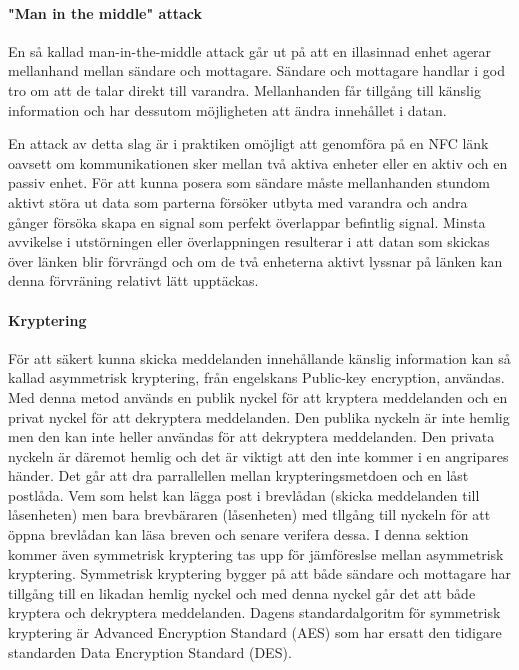 \documentclass[11pt]{article}
\begin{document}
\paragraph{"Man in the middle" attack}
En så kallad man-in-the-middle attack går ut på att en illasinnad enhet agerar mellanhand mellan sändare och mottagare. Sändare och mottagare handlar i god tro om att de talar direkt till varandra. Mellanhanden får tillgång till känslig information och har dessutom möjligheten att ändra innehållet i datan. 

En attack av detta slag är i praktiken omöjligt att genomföra på en NFC länk oavsett om kommunikationen sker mellan två aktiva enheter eller en aktiv och en passiv enhet. För att kunna posera som sändare måste mellanhanden stundom aktivt störa ut data som parterna försöker utbyta med varandra och andra gånger försöka skapa en signal som perfekt överlappar befintlig signal. Minsta avvikelse i utstörningen eller överlappningen resulterar i att datan som skickas över länken blir förvrängd och om de två enheterna aktivt lyssnar på länken kan denna förvräning relativt lätt upptäckas.

\paragraph{Kryptering}
För att säkert kunna skicka meddelanden innehållande känslig information kan så kallad asymmetrisk kryptering, från engelskans Public-key encryption, användas. Med denna metod används en publik nyckel för att kryptera meddelanden och en privat nyckel för att dekryptera meddelanden. Den publika nyckeln är inte hemlig men den kan inte heller användas för att dekryptera meddelanden. Den privata nyckeln är däremot hemlig och det är viktigt att den inte kommer i en angripares händer. Det går att dra parrallellen mellan krypteringsmetdoen och en låst postlåda. Vem som helst kan lägga post i brevlådan (skicka meddelanden till låsenheten) men bara brevbäraren (låsenheten) med tllgång till nyckeln för att öppna brevlådan kan läsa breven och senare verifera dessa. I denna sektion kommer även symmetrisk kryptering tas upp för jämföreslse mellan asymmetrisk kryptering. Symmetrisk kryptering bygger på att både sändare och mottagare har tillgång till en likadan hemlig nyckel och med denna nyckel går det att både kryptera och dekryptera meddelanden. Dagens standardalgoritm för symmetrisk kryptering är Advanced Encryption Standard (AES) som har ersatt den tidigare standarden Data Encryption Standard (DES).
   
\end{document}
